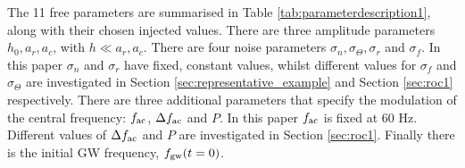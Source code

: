 \documentclass[pra,superscriptaddress,reprint,amsmath,amssymb,nofootinbib]{revtex4-2}
\begin{document}
The 11 free parameters are summarised in Table \ref{tab:parameterdescription1}, along with their chosen injected values. There are three amplitude parameters $h_0, a_r, a_c$, with $h \ll a_r, a_c$. There are four noise parameters $\sigma_n, \sigma_{\Theta}, \sigma_r$ and  $\sigma_f$. In this paper $\sigma_n$ and $\sigma_r$ have fixed, constant values, whilst different values for $\sigma_f$ and $\sigma_{\Theta}$ are investigated in Section \ref{sec:representative_example} and Section \ref{sec:roc1} respectively. There are three additional parameters that specify the modulation of the central frequency: $f_{\rm ac}$, $\Delta f_{\rm ac}$ and $P$. In this paper $f_{\rm ac}$ is fixed at 60 Hz. Different values of $\Delta f_{\rm ac}$ and $P$ are investigated in Section \ref{sec:roc1}. Finally there is the initial GW frequency, $f_{\rm gw}(t=0)$.
\begin{table}
	
	\begin{tabular}{llcc}
		\hline 
		

\end{tabular}
\end{table}
\end{document}
